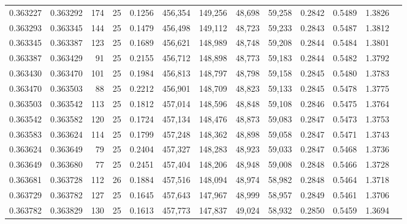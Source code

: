 \begin{tabular}{rrrrrrrrrrrrr}
0.363227 & 0.363292 &   174 &  25 &                                     0.1256 & 456,354 & 149,256 &  48,698 &  59,258 & 0.2842 & 0.5489 & 1.3826 \\
0.363293 & 0.363345 &   144 &  25 &                                     0.1479 & 456,498 & 149,112 &  48,723 &  59,233 & 0.2843 & 0.5487 & 1.3812 \\
0.363345 & 0.363387 &   123 &  25 &                                     0.1689 & 456,621 & 148,989 &  48,748 &  59,208 & 0.2844 & 0.5484 & 1.3801 \\
0.363387 & 0.363429 &    91 &  25 &                                     0.2155 & 456,712 & 148,898 &  48,773 &  59,183 & 0.2844 & 0.5482 & 1.3792 \\
0.363430 & 0.363470 &   101 &  25 &                                     0.1984 & 456,813 & 148,797 &  48,798 &  59,158 & 0.2845 & 0.5480 & 1.3783 \\
0.363470 & 0.363503 &    88 &  25 &                                     0.2212 & 456,901 & 148,709 &  48,823 &  59,133 & 0.2845 & 0.5478 & 1.3775 \\
0.363503 & 0.363542 &   113 &  25 &                                     0.1812 & 457,014 & 148,596 &  48,848 &  59,108 & 0.2846 & 0.5475 & 1.3764 \\
0.363542 & 0.363582 &   120 &  25 &                                     0.1724 & 457,134 & 148,476 &  48,873 &  59,083 & 0.2847 & 0.5473 & 1.3753 \\
0.363583 & 0.363624 &   114 &  25 &                                     0.1799 & 457,248 & 148,362 &  48,898 &  59,058 & 0.2847 & 0.5471 & 1.3743 \\
0.363624 & 0.363649 &    79 &  25 &                                     0.2404 & 457,327 & 148,283 &  48,923 &  59,033 & 0.2847 & 0.5468 & 1.3736 \\
0.363649 & 0.363680 &    77 &  25 &                                     0.2451 & 457,404 & 148,206 &  48,948 &  59,008 & 0.2848 & 0.5466 & 1.3728 \\
0.363681 & 0.363728 &   112 &  26 &                                     0.1884 & 457,516 & 148,094 &  48,974 &  58,982 & 0.2848 & 0.5464 & 1.3718 \\
0.363729 & 0.363782 &   127 &  25 &                                     0.1645 & 457,643 & 147,967 &  48,999 &  58,957 & 0.2849 & 0.5461 & 1.3706 \\
0.363782 & 0.363829 &   130 &  25 &                                     0.1613 & 457,773 & 147,837 &  49,024 &  58,932 & 0.2850 & 0.5459 & 1.3694 \\

\end{tabular}
